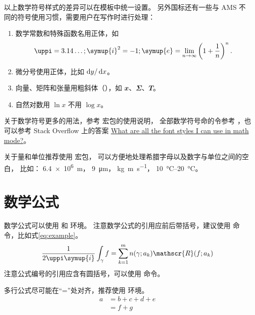 以上数学符号样式的差异可以在模板中统一设置。
另外国标还有一些与 AMS 不同的符号使用习惯，需要用户在写作时进行处理：
\begin{enumerate}
  \item 数学常数和特殊函数名用正体，如
    \begin{equation*}
      \uppi = 3.14\dots; \quad
      \symup{i}^2 = -1; \quad
      \symup{e} = \lim_{n \to \infty} \left( 1 + \frac{1}{n} \right)^n.
    \end{equation*}
  \item 微分号使用正体，比如 $\mathop{}\!\mathrm{d} y / \mathop{}\!\mathrm{d} x$。
  \item 向量、矩阵和张量用粗斜体（），如 $\mathbfit{x}$、$\mathbfit{\Sigma}$、$\mathbfit{T}$。
  \item 自然对数用 $\ln x$ 不用 $\log x$。
\end{enumerate}



关于数学符号更多的用法，参考
\href{http://mirrors.ctan.org/macros/latex/contrib/unicode-math/unicode-math.pdf}{}
宏包的使用说明，
全部数学符号命的令参考
\href{http://mirrors.ctan.org/macros/latex/contrib/unicode-math/unimath-symbols.pdf}{}，也可以参考 Stack Overflow 上的答案 \href{https://tex.stackexchange.com/questions/58098/what-are-all-the-font-styles-i-can-use-in-math-mode}{What are all the font styles I can use in math mode?}。

关于量和单位推荐使用
\href{http://mirrors.ctan.org/macros/latex/contrib/siunitx/siunitx.pdf}{}
宏包，
可以方便地处理希腊字母以及数字与单位之间的空白，
比如：
\SI{6.4e6}{m}，
\SI{9}{\micro\meter}，
\si{kg.m.s^{-1}}，
\SIrange{10}{20}{\degreeCelsius}。



\section{数学公式}

数学公式可以使用  和  环境。
注意数学公式的引用应前后带括号，建议使用  命令，比如式\eqref{eq:example}。
\begin{equation}
  \frac{1}{2 \uppi \symup{i}} \int_\gamma f = \sum_{k=1}^m n(\gamma; a_k) \mathscr{R}(f; a_k)
  \label{eq:example}
\end{equation}
注意公式编号的引用应含有圆括号，可以使用  命令。

多行公式尽可能在“=”处对齐，推荐使用  环境。
\begin{align}
  a & = b + c + d + e \\
    & = f + g
\end{align}

